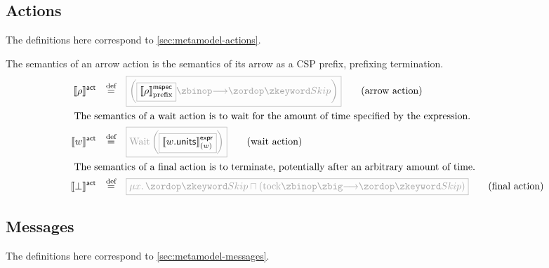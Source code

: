 \subsection{Actions}\label{ssec:semantics-tockcsp-actions}

The definitions here correspond to \cref{sec:metamodel-actions}.

\begin{definition}[\msequenceaction]

\newcommand{\wait}[1]{\text{Wait}\left(#1\right)}
  
The semantics of an arrow action is the semantics of its arrow as a CSP prefix,
prefixing termination.
%
\begin{align*}
  \actsema{\anarrow}
  \quad\defeq\quad
  &
    \tlang{
    \left(
    \olang{\pmspecsema{\anarrow}}
    \then
    \Skip
    \right)
    }
    \tag{arrow action}
  \\
  \intertext{
  The semantics of a wait action is to wait for the amount of time specified by the expression.}
  \actsema{\await}
  \quad\defeq\quad
  &
    \tlang{
    \wait{\olang{\exprsema{\field{\await}{units}}{\await}}}
    }
    \tag{wait action}
  \\
  \intertext{
  The semantics of a final action is to terminate, potentially after an arbitrary amount of time.}
  \actsema{\bot}
  \quad\defeq\quad
  &
    \tlang{
    \mu x \ldotp
    \Skip
    \sqcap
    \left(\text{tock} \circthen \Skip\right)
    }
    \tag{final action}
\end{align*}

\end{definition}

\subsection{Messages}\label{ssec:semantics-tockcsp-messages}

The definitions here correspond to \cref{sec:metamodel-messages}.

